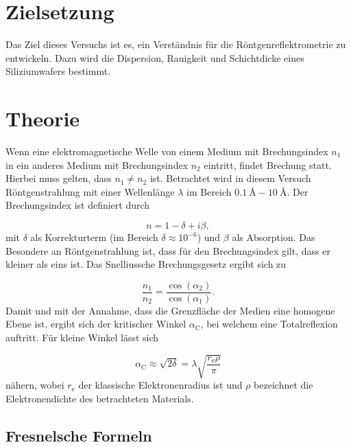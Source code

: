 \section{Zielsetzung}
\label{sec:Zielsetzung}

Das Ziel dieses Versuchs ist es, ein Verständnis für die Röntgenreflektrometrie zu entwickeln.
Dazu wird die Dispersion, Rauigkeit und Schichtdicke eines Siliziumwafers bestimmt.


\section{Theorie}
\label{sec:Theorie}

Wenn eine elektromagnetische Welle von einem Medium mit Brechungsindex $n_1$ in ein anderes Medium mit 
Brechungsindex $n_2$ eintritt, findet Brechung statt. Hierbei muss gelten, dass $n_1 \neq n_2$ ist. 
Betrachtet wird in diesem Versuch Röntgenstrahlung mit einer Wellenlänge $\lambda$ im Bereich 
$\SI{0.1}{\angstrom}-\SI{10}{\angstrom}$. Der Brechungsindex ist definiert durch

\begin{equation*}
    n = 1-\delta +i\beta,
\end{equation*}
mit $\delta$ als Korrekturterm (im Bereich $\delta \approx 10^{-6}$) und $\beta$ als Absorption. 
Das Besondere an Röntgenstrahlung ist, dass für den Brechungsindex gilt, dass er kleiner als eins ist.
Das Snelliussche Brechungsgesetz ergibt sich zu

\begin{equation*}
    \frac{n_1}{n_2} = \frac{\cos{\left(\alpha_2\right)}}{\cos{\left(\alpha_1\right)}}.
\end{equation*}
Damit und mit der Annahme, dass die Grenzfläche der Medien eine homogene Ebene ist, ergibt sich der kritischer Winkel $\alpha_\text{C}$, 
bei welchem eine Totalreflexion auftritt. Für kleine Winkel lässt sich

\begin{equation*}
    \label{eqn:kritschwiknekl}
    \alpha_\text{C} \approx \sqrt{2\delta} = \lambda \sqrt{\frac{r_\text{e}\rho}{\pi}}
\end{equation*}
nähern, wobei $r_\text{e}$ der klassische Elektronenradius ist und $\rho$ bezeichnet die Elektronendichte des betrachteten Materials. 

\subsection{Fresnelsche Formeln}


